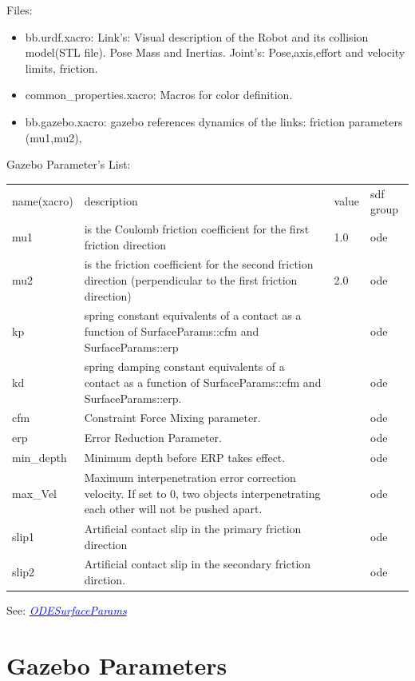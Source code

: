 \documentclass[twoside,colorback,accentcolor=tud4c,11pt]{tudreport}
\newcommand{\mylink}[2] {	\hyperlink{#1}{	\textit{\textcolor{blue}{#2}}}}
\begin{document}
Files:
\begin{itemize}
	\item bb.urdf.xacro: Link's: Visual description of the Robot and its collision model(STL file). Pose Mass and Inertias. Joint's: Pose,axis,effort and velocity limits, friction.
	\item common\_properties.xacro: Macros for color definition.
	\item bb.gazebo.xacro: gazebo references dynamics of the links: friction parameters (mu1,mu2), 
\end{itemize}

Gazebo Parameter's List:\\
\begin{tabular}{l L{12cm} l l}
	name(xacro)&description&value&sdf group\\
	mu1&is the Coulomb friction coefficient for the first friction direction&1.0&ode\\
	mu2& is the friction coefficient for the second friction direction (perpendicular to the first friction direction)&2.0&ode\\
	kp&spring constant equivalents of a contact as a function of SurfaceParams::cfm and SurfaceParams::erp & &ode \\
	kd&spring damping constant equivalents of a contact as a function of SurfaceParams::cfm and SurfaceParams::erp.   & &ode \\
	cfm&Constraint Force Mixing parameter.& &ode \\
	erp&Error Reduction Parameter.& &ode \\
	min\_depth&Minimum depth before ERP takes effect.   & &ode \\
	max\_Vel& Maximum interpenetration error correction velocity.
	If set to 0, two objects interpenetrating each other will not be pushed apart.  & &ode \\
	slip1&Artificial contact slip in the primary friction direction  & &ode \\
	slip2&Artificial contact slip in the secondary friction dirction.& &ode \\
\end{tabular}

See: \mylink{http://osrf-distributions.s3.amazonaws.com/gazebo/api/dev/classgazebo_1_1physics_1_1ODESurfaceParams.html}{ODESurfaceParams}

\section{Gazebo Parameters}
\end{document}
